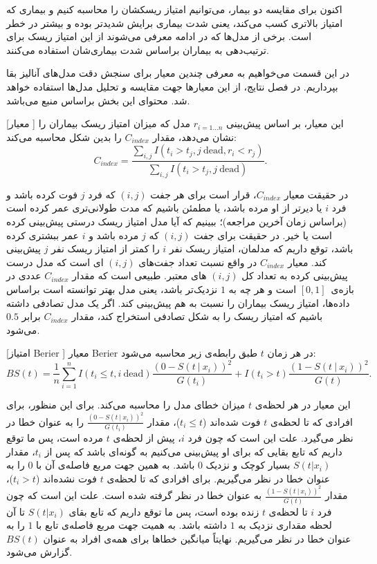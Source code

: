 اکنون برای مقایسه دو بیمار، می‌توانیم امتیاز ریسکشان را محاسبه کنیم و بیماری که امتیاز بالاتری کسب می‌کند، یعنی شدت بیماری برایش شدیدتر بوده و بیشتر در خطر است. برخی از مدل‌ها که در ادامه معرفی می‌شوند از این امتیاز ریسک برای ترتیب‌دهی به بیماران براساس شدت بیماری‌شان استفاده می‌کنند.

در این قسمت می‌خواهیم به معرفی چندین معیار  برای سنجش دقت مدل‌های آنالیز بقا بپرداریم. در فصل نتایج، از این معیارها جهت مقایسه و تحلیل مدل‌ها استفاده خواهد شد. محتوای این بخش براساس منبع  می‌باشد.

[معیار  ]
این معیار، بر اساس پیش‌بینی $r_{i=1 ... n}$ مدل که میزان امتیاز ریسک بیماران را نشان می‌دهد، مقدار $C_{index}$ را بدین شکل محاسبه می‌کند:
$$C_{index}=\frac{
	\sum_{i, j}I(t_i>t_j, j\ \text{dead}, r_i<r_j)
	}{
	\sum_{i, j}I(t_i>t_j, j\ \textrm{dead})	
	}.$$

در حقیقت معیار $C_{index}$، قرار است برای هر جفت $(i, j)$ که فرد $j$ فوت کرده باشد و فرد $i$ یا دیرتر از او مرده باشد، یا مطمئن باشیم که مدت طولانی‌تری عمر کرده است (براساس زمان آخرین مراجعه)؛ ببینیم که آیا مدل امتیاز ریسک درستی پیش‌بینی کرده است یا خیر. در حقیقت برای جفت $(i, j)$ که $j$ مرده باشد و $i$ عمر ببشتری کرده باشد، توقع داریم که مدلمان، امتیاز ریسک نفر $i$ را کمتر از امتیاز ریسک نفر $j$ پیش‌بینی کند. معیار $C_{index}$ در واقع نسبت تعداد جفت‌های $(i, j)$ ای است که مدل درست پیش‌بینی کرده به تعداد کل $(i, j)$ های معتبر. طبیعی است که مقدار $C_{index}$ عددی در بازه‌ی~$\left[0, 1\right]$ است و هر چه به $1$ نزدیک‌تر باشد، یعنی مدل بهتر توانسته است براساس داده‌ها، امتیاز ریسک بیماران را نسبت به هم پیش‌بینی کند. اگر یک مدل تصادفی داشته باشیم که امتیاز ریسک را به شکل تصادفی استخراج کند، مقدار $C_{index}$ برابر $0.5$ می‌شود.

[امتیاز Berier ]
معیار Berier در هر زمان $t$ طبق رابطه‌ی زیر محاسبه می‌شود:
$$BS(t) = \frac{1}{n}
\sum_{i=1}^n I(t_i \leq t, i\ \textrm{dead}) \frac{(0-S(t\ |\ x_i))^2}{G(t_i)}
+
I(t_i>t)\frac{(1 - S(t\ |\ x_i))^2}{G(t)}
.
$$

این معیار در هر لحظه‌ی $t$ میزان خطای مدل را محاسبه می‌کند. برای این منظور، 
برای افرادی که تا لحظه‌ی $t$ فوت شده‌اند ($t_i \leq t$)،
مقدار 
$\frac{(0-S(t\ |\ x_i))^2}{G(t_i)}$
را به عنوان خطا در نظر می‌گیرد. علت این است که چون فرد $i$، پیش از لحظه‌ی $t$ مرده است، پس ما توقع داریم که تابع بقایی که برای او پیش‌بینی می‌کنیم به گونه‌ای باشد که پس از $t_i$، مقدار $S(t|x_i)$ بسیار کوچک و نزدیک $0$ باشد. به همین جهت مربع فاصله‌ی آن با $0$ را به عنوان خطا در نظر می‌گیریم.
برای افرادی که تا لحظه‌ی $t$ فوت نشده‌اند ($t_i > t$)،
مقدار 
$\frac{(1 - S(t\ |\ x_i))^2}{G(t)}$
به عنوان خطا در نظر گرفته شده است. علت این است که چون فرد $i$ تا لحظه‌ی $t$ زنده بوده است، پس ما توقع داریم که تابع بقای‌ $S(t|x_i)$ تا آن لحظه مقداری نزدیک به $1$ داشته باشد. به همیت جهت مربع فاصله‌ی تابع با $1$ را به عنوان خطا در نظر می‌گیریم. نهایتاً میانگین خطاها برای همه‌ی افراد به عنوان $BS(t)$ گزارش می‌شود.

